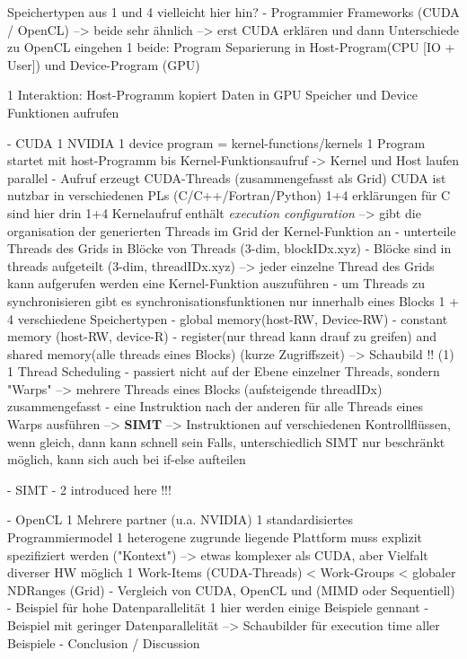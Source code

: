 \documentclass[a4paper,12pt]{llncs}
\numberwithin{equation}{section}
\begin{document}
    Speichertypen aus 1 und 4 vielleicht hier hin?
  - Programmier Frameworks (CUDA / OpenCL)	
    --> beide sehr ähnlich --> erst CUDA erklären und dann Unterschiede zu OpenCL eingehen
    1 beide: Program Separierung in Host-Program(CPU [IO + User]) und Device-Program (GPU)

    
    1 Interaktion: Host-Programm kopiert Daten in GPU Speicher und Device Funktionen aufrufen
    
    - CUDA
      1 NVIDIA
      1 device program = kernel-functions/kernels
      1 Program startet mit host-Programm bis Kernel-Funktionsaufruf -> Kernel und Host laufen parallel
      	- Aufruf erzeugt CUDA-Threads (zusammengefasst als Grid)
      CUDA ist nutzbar in verschiedenen PLs (C/C++/Fortran/Python)
      1+4 erklärungen für C sind hier drin
	  1+4 Kernelaufruf enthält \textit{execution configuration}
	  	--> gibt die organisation der generierten Threads im Grid der Kernel-Funktion an
	  	  - unterteile Threads des Grids in Blöcke von Threads (3-dim, blockIDx.xyz)
	  	  - Blöcke sind in threads aufgeteilt (3-dim, threadIDx.xyz)
	   --> jeder einzelne Thread des Grids kann aufgerufen werden eine Kernel-Funktion auszuführen      
          - um Threads zu synchronisieren gibt es synchronisationsfunktionen nur innerhalb eines Blocks
      1 + 4 verschiedene Speichertypen
        - global memory(host-RW, Device-RW)
        - constant memory (host-RW, device-R)
        - register(nur thread kann drauf zu greifen) and shared memory(alle threads eines Blocks) (kurze Zugriffszeit)
        --> Schaubild !! (1)
      1 Thread Scheduling
        - passiert nicht auf der Ebene einzelner Threads, sondern "Warps" --> mehrere Threads eines Blocks (aufsteigende threadIDx) zusammengefasst
        - eine Instruktion nach der anderen für alle Threads eines Warps ausführen --> \textbf{SIMT}
          --> Instruktionen auf verschiedenen Kontrollflüssen, wenn gleich, dann kann schnell sein
          	Falls, unterschiedlich SIMT nur beschränkt möglich, kann sich auch bei if-else aufteilen
        
        - SIMT
          - 
          2 introduced here !!!
        
      
    - OpenCL
      1 Mehrere partner (u.a. NVIDIA) 
      1 standardisiertes Programmiermodel
      1 heterogene zugrunde liegende Plattform muss explizit spezifiziert werden ("Kontext")
        --> etwas komplexer als CUDA, aber Vielfalt diverser HW möglich
      1 Work-Items (CUDA-Threads) < Work-Groups < globaler NDRanges (Grid)
- Vergleich von CUDA, OpenCL und (MIMD oder Sequentiell)
  - Beispiel für hohe Datenparallelität
  	1 hier werden einige Beispiele gennant
  - Beispiel mit geringer Datenparallelität
  --> Schaubilder für execution time aller Beispiele
- Conclusion / Discussion
\end{document}
